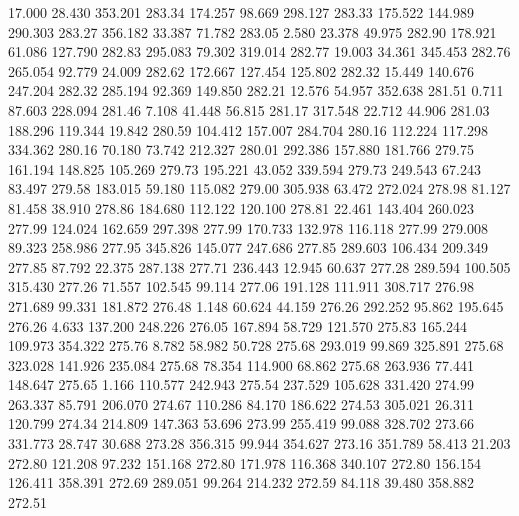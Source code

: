   17.000   28.430  353.201       283.34
 174.257   98.669  298.127       283.33
 175.522  144.989  290.303       283.27
 356.182   33.387   71.782       283.05
   2.580   23.378   49.975       282.90
 178.921   61.086  127.790       282.83
 295.083   79.302  319.014       282.77
  19.003   34.361  345.453       282.76
 265.054   92.779   24.009       282.62
 172.667  127.454  125.802       282.32
  15.449  140.676  247.204       282.32
 285.194   92.369  149.850       282.21
  12.576   54.957  352.638       281.51
   0.711   87.603  228.094       281.46
   7.108   41.448   56.815       281.17
 317.548   22.712   44.906       281.03
 188.296  119.344   19.842       280.59
 104.412  157.007  284.704       280.16
 112.224  117.298  334.362       280.16
  70.180   73.742  212.327       280.01
 292.386  157.880  181.766       279.75
 161.194  148.825  105.269       279.73
 195.221   43.052  339.594       279.73
 249.543   67.243   83.497       279.58
 183.015   59.180  115.082       279.00
 305.938   63.472  272.024       278.98
  81.127   81.458   38.910       278.86
 184.680  112.122  120.100       278.81
  22.461  143.404  260.023       277.99
 124.024  162.659  297.398       277.99
 170.733  132.978  116.118       277.99
 279.008   89.323  258.986       277.95
 345.826  145.077  247.686       277.85
 289.603  106.434  209.349       277.85
  87.792   22.375  287.138       277.71
 236.443   12.945   60.637       277.28
 289.594  100.505  315.430       277.26
  71.557  102.545   99.114       277.06
 191.128  111.911  308.717       276.98
 271.689   99.331  181.872       276.48
   1.148   60.624   44.159       276.26
 292.252   95.862  195.645       276.26
   4.633  137.200  248.226       276.05
 167.894   58.729  121.570       275.83
 165.244  109.973  354.322       275.76
   8.782   58.982   50.728       275.68
 293.019   99.869  325.891       275.68
 323.028  141.926  235.084       275.68
  78.354  114.900   68.862       275.68
 263.936   77.441  148.647       275.65
   1.166  110.577  242.943       275.54
 237.529  105.628  331.420       274.99
 263.337   85.791  206.070       274.67
 110.286   84.170  186.622       274.53
 305.021   26.311  120.799       274.34
 214.809  147.363   53.696       273.99
 255.419   99.088  328.702       273.66
 331.773   28.747   30.688       273.28
 356.315   99.944  354.627       273.16
 351.789   58.413   21.203       272.80
 121.208   97.232  151.168       272.80
 171.978  116.368  340.107       272.80
 156.154  126.411  358.391       272.69
 289.051   99.264  214.232       272.59
  84.118   39.480  358.882       272.51
